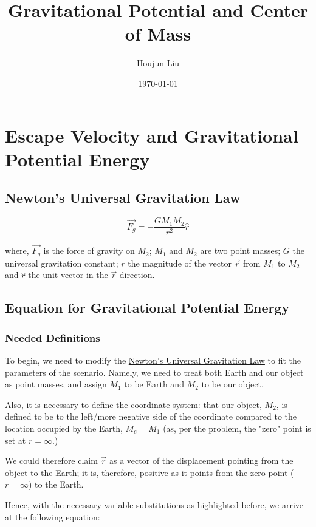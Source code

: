 \documentclass[letterpaper]{article}
\author{Houjun Liu}
\date{\today}
\title{Gravitational Potential and Center of Mass}
\renewcommand\maketitle{}
\begin{document}
\maketitle

\section{Escape Velocity and Gravitational Potential Energy}
\label{sec:orge06f2ad}

\subsection{Newton's Universal Gravitation Law}
\label{sec:org9a93ef4}
\begin{equation}
\vec{F_g} = - \frac{GM_1M_2}{r^2} \hat{r}
\end{equation}

where, \(\vec{F_g}\) is the force of gravity on \(M_2\); \(M_1\) and \(M_2\) are two point masses; \(G\) the universal gravitation constant; \(r\) the magnitude of the vector \(\vec{r}\) from \(M_1\) to \(M_2\) and \(\hat{r}\) the unit vector in the \(\vec{r}\) direction.

\subsection{Equation for Gravitational Potential Energy}
\label{sec:org455b5bb}

\subsubsection{Needed Definitions}
\label{sec:orgaa3e185}
To begin, we need to modify the \hyperref[sec:org9a93ef4]{Newton's Universal Gravitation Law} to fit the parameters of the scenario. Namely, we need to treat both Earth and our object as point masses, and assign \(M_1\) to be Earth and \(M_2\) to be our object.

Also, it is necessary to define the coordinate system: that our object, \(M_2\), is defined to be to the left/more negative side of the coordinate compared to the location occupied by the Earth, \(M_e=M_1\) (as, per the problem, the "zero" point is set at \(r = \infty\).)

We could therefore claim \(\vec{r}\) as a vector of the displacement pointing from the object to the Earth; it is, therefore, positive as it points from the zero point (\(r=\infty\)) to the Earth.

Hence, with the necessary variable substitutions as highlighted before, we arrive at the following equation:
\end{document}
